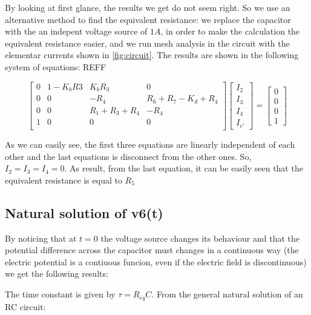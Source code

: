 By looking at first glance, the results we get do not seem right. So we use an alternative method to find the equivalent resistance: we replace the capacitor with the an indepent voltage source of $1 A$, in order to make the calculation the equivalent resistance easier,
and we run mesh analysis in the circuit with the elementar currents shown in \ref{fig:circuit}. The results are shown in the following system of equations: REFF

\[
  \begin{bmatrix}
    0 & 1-K_b R3 & K_b R_3         & 0                     \\
    0 & 0        & -R_4            & R_6 + R_7 - K_d + R_4 \\
    0 & 0        & R_1 + R_3 + R_4 & -R_4                  \\
    1 & 0        & 0               & 0                     \\
  \end{bmatrix}
  \begin{bmatrix}
    I_2 \\ I_3 \\ I_4 \\ I_{c'}
  \end{bmatrix}
  =
  \begin{bmatrix}
    0 \\ 0 \\ 0 \\ 1
  \end{bmatrix}
\]

\hfill


As we can easily see, the first three equations are linearly independent of each other and the last equations is disconnect from the other ones. So, $I_2 = I_3 = I_4 = 0$. As result, from the last equation, it can be easily seen that
the equivalent resistance is equal to $R_5$




\subsection{Natural solution of v6(t)}

By noticing that at $t = 0$ the voltage source changes its behaviour and that the potential difference across the capacitor must changes in a continuous way (the electric potential is a contiuous funcion, even  if the electric field is discontinuous)
we get the following results:

The time constant is given by $\tau = R_{eq}C$.
From the general natural solution of an RC circuit:

